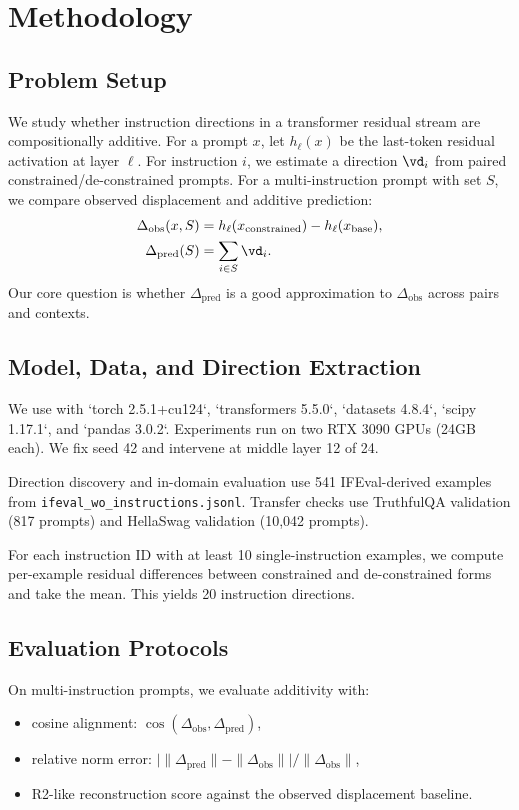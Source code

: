 \section{Methodology}
\label{sec:methodology}
\subsection{Problem Setup}
We study whether instruction directions in a transformer residual stream are compositionally additive. For a prompt $x$, let $h_\ell(x)$ be the last-token residual activation at layer $\ell$. For instruction $i$, we estimate a direction $\vd_i$ from paired constrained/de-constrained prompts. For a multi-instruction prompt with set $S$, we compare observed displacement and additive prediction:
\begin{align}
\Delta_{\text{obs}}(x, S) &= h_\ell(x_{\text{constrained}}) - h_\ell(x_{\text{base}}), \\
\Delta_{\text{pred}}(S) &= \sum_{i \in S} \vd_i.
\end{align}
Our core question is whether $\Delta_{\text{pred}}$ is a good approximation to $\Delta_{\text{obs}}$ across pairs and contexts.

\subsection{Model, Data, and Direction Extraction}
We use \qwenmodel with `torch 2.5.1+cu124`, `transformers 5.5.0`, `datasets 4.8.4`, `scipy 1.17.1`, and `pandas 3.0.2`. Experiments run on two RTX 3090 GPUs (24GB each). We fix seed 42 and intervene at middle layer 12 of 24.

Direction discovery and in-domain evaluation use 541 IFEval-derived examples from \texttt{ifeval\_wo\_instructions.jsonl}. Transfer checks use TruthfulQA validation (817 prompts) and HellaSwag validation (10,042 prompts).

For each instruction ID with at least 10 single-instruction examples, we compute per-example residual differences between constrained and de-constrained forms and take the mean. This yields 20 instruction directions.

\subsection{Evaluation Protocols}
On multi-instruction prompts, we evaluate additivity with:
\begin{itemize}[leftmargin=*]
    \item cosine alignment: $\cos(\Delta_{\text{obs}}, \Delta_{\text{pred}})$,
    \item relative norm error: $\lvert\|\Delta_{\text{pred}}\| - \|\Delta_{\text{obs}}\|\rvert / \|\Delta_{\text{obs}}\|$,
    \item R2-like reconstruction score against the observed displacement baseline.
\end{itemize}

